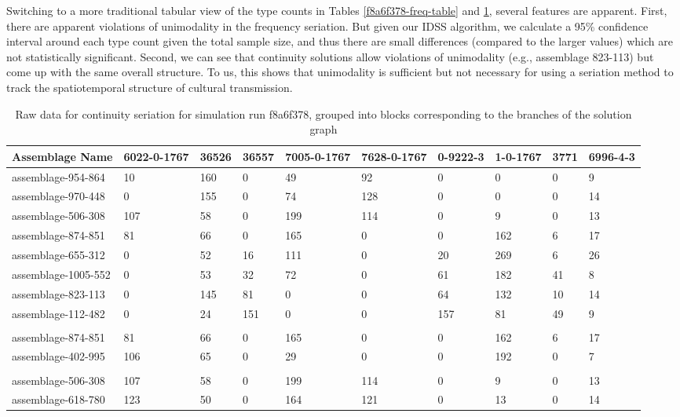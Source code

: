 \documentclass[graybox,natbib]{svmult}
\begin{document}
Switching to a more traditional tabular view of the type counts in
Tables \ref{f8a6f378-freq-table} and \ref{f8a6f378-cont-table}, several
features are apparent. First, there are apparent violations of
unimodality in the frequency seriation. But given our IDSS algorithm, we
calculate a 95\% confidence interval around each type count given the
total sample size, and thus there are small differences (compared to the
larger values) which are not statistically significant. Second, we can
see that continuity solutions allow violations of unimodality (e.g.,
assemblage 823-113) but come up with the same overall structure. To us,
this shows that unimodality is sufficient but not necessary for using a
seriation method to track the spatiotemporal structure of cultural
transmission.

\begin{table}[ht]
\centering
\begin{tabular}{@{}llllllllll@{}}
\toprule
Assemblage Name & 6022-0-1767 & 36526 & 36557 & 7005-0-1767 & 7628-0-1767 & 0-9222-3 & 1-0-1767 & 3771 & 6996-4-3 \\ \midrule
assemblage-954-864 & 10 & 160 & 0 & 49 & 92 & 0 & 0 & 0 & 9 \\
assemblage-970-448 & 0 & 155 & 0 & 74 & 128 & 0 & 0 & 0 & 14 \\
assemblage-506-308 & 107 & 58 & 0 & 199 & 114 & 0 & 9 & 0 & 13 \\
assemblage-874-851 & 81 & 66 & 0 & 165 & 0 & 0 & 162 & 6 & 17 \\
assemblage-655-312 & 0 & 52 & 16 & 111 & 0 & 20 & 269 & 6 & 26 \\
assemblage-1005-552 & 0 & 53 & 32 & 72 & 0 & 61 & 182 & 41 & 8 \\
assemblage-823-113 & 0 & 145 & 81 & 0 & 0 & 64 & 132 & 10 & 14 \\
assemblage-112-482 & 0 & 24 & 151 & 0 & 0 & 157 & 81 & 49 & 9 \\
 &  &  &  &  &  &  &  &  &  \\
assemblage-874-851 & 81 & 66 & 0 & 165 & 0 & 0 & 162 & 6 & 17 \\
assemblage-402-995 & 106 & 65 & 0 & 29 & 0 & 0 & 192 & 0 & 7 \\
 &  &  &  &  &  &  &  &  &  \\
assemblage-506-308 & 107 & 58 & 0 & 199 & 114 & 0 & 9 & 0 & 13 \\
assemblage-618-780 & 123 & 50 & 0 & 164 & 121 & 0 & 13 & 0 & 14 \\ \bottomrule
\end{tabular}
\caption{Raw data for continuity seriation for simulation run f8a6f378, grouped into blocks corresponding to the branches of the solution graph}
\label{f8a6f378-cont-table}
\end{table}
\end{document}
